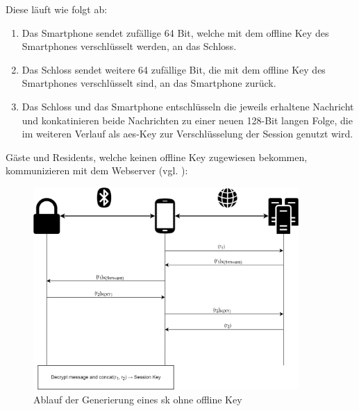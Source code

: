 		Diese läuft wie folgt ab:
        \begin{enumerate}[noitemsep]
            \item Das Smartphone sendet zufällige 64 Bit, welche mit dem offline Key des Smartphones verschlüsselt werden, an das Schloss.
            \item Das Schloss sendet weitere 64 zufällige Bit, die mit dem offline Key des Smartphones verschlüsselt sind, an das Smartphone zurück.
            \item Das Schloss und das Smartphone entschlüsseln die jeweils erhaltene Nachricht und konkatinieren beide Nachrichten zu einer neuen 128-Bit langen Folge, die im weiteren Verlauf als \gls{aes}-Key zur Verschlüsselung der Session genutzt wird.
        \end{enumerate}
        
        \indent Gäste und Residents, welche keinen offline Key zugewiesen bekommen, kommunizieren mit dem Webserver (vgl. ):
        
        \begin{figure}[!htbp]
    		\centering
    		\includegraphics[width=0.9\textwidth]{graphics/online_key.png}
    		\caption[Generierung eines Session Keys ohne Offline Key]{Ablauf der Generierung eines \gls{sk} ohne offline Key\cite{Fuller2017}}
    		\label{fig:online_key}
    	\end{figure}
        
